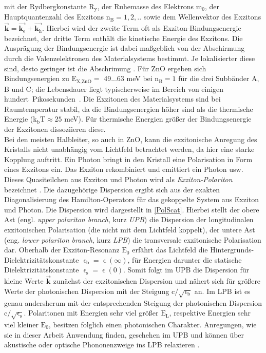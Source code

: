 mit der Rydbergkonstante $\text{R}_\text{y}$, der Ruhemasse des Elektrons $\text{m}_\text{0}$, der Hauptquantenzahl des Exzitons $\text{n}_\text{B}= 1, 2, ..$ sowie dem Wellenvektor des Exzitons $\vec{\textbf{k}}= \vec{\textbf{k$_\text{e}$}}+\vec{\textbf{k$_\text{h}$}}$. Hierbei wird der zweite Term oft als Exziton-Bindungsenergie bezeichnet, der dritte Term enthält die kinetische Energie des Exzitons. Die Ausprägung der Bindungsenergie ist dabei \mbox{maßgeblich} von der Abschirmung durch die Valenzelektronen des \mbox{Materialsystems} bestimmt. Je lokalisierter diese sind, desto geringer ist die Abschrimung \cite{Dvorak.2013}. Für ZnO ergeben sich  Bindungsenergien zu $\text{E}_\text{X,ZnO}=$ 49...63 meV \cite{Mang.1995} bei $\text{n}_\text{B}= 1$ für die drei \mbox{Subbänder} A, B und C; die Lebensdauer liegt typischerweise im Bereich von einigen \mbox{hundert Pikosekunden \cite{Zhang.2007}}. Die Exzitonen des Materialsystems sind bei \mbox{Raumtemperatur} stabil, da die Bindungsenergien höher sind als die thermische Energie ($\text{k}_\text{b}\text{T} \approx 25$ meV). Für thermische Energien größer der Bindungsenergie der Exzitonen dissoziieren diese.\\
Bei den meisten Halbleiter, so auch in ZnO, kann die exzitonische Anregung des \mbox{Kristalls} nicht unabhängig vom Lichtfeld betrachtet werden, da hier eine starke \mbox{Kopplung} \mbox{auftritt}. Ein Photon bringt in den Kristall eine Polarisation in Form eines Exzitons ein. Das \mbox{Exziton} rekombiniert und emittiert ein Photon usw. Dieses Quasiteilchen aus Exziton und Photon wird als \textit{Exziton-Polariton} bezeichnet \cite{Hopfield.1958}. Die dazugehörige \mbox{Dispersion} ergibt sich aus der exakten Diagonalisierung des Hamilton-Operators für das gekoppelte System aus Exziton und Photon. Die Dispersion wird dargestellt in \autoref{PolScat}. Hierbei stellt der obere Ast (engl. \textit{upper polariton branch}, kurz \textit{UPB}) die Dispersion der longitudinalen exzitonischen Polarisation (die nicht mit dem \mbox{Lichtfeld} koppelt), der untere Ast (eng. \textit{lower polariton branch}, kurz \textit{LPB}) die \mbox{transversale} \mbox{exzitonische} \mbox{Polarisation} dar. Oberhalb der Exziton-Resonanz $\text{E}_\text{0}$ erfährt das \mbox{Lichtfeld} die Hintergrunds-Dielektrizitätskonstante $\upvarepsilon _\text{b}=\upvarepsilon (\infty)$, für Energien darunter die \mbox{statische} Dielektrizitätskonstante $\upvarepsilon _\text{s}=\upvarepsilon (\text{0})$. Somit folgt im UPB die Dispersion für \mbox{kleine} \mbox{Werte} $\vec{\textbf{k}}$ zunächst der exzitonischen Dispersion und nähert sich für größere Werte der \mbox{photonischen} Dispersion mit der Steigung $\text{c}/\sqrt{\upvarepsilon _\text{b}}$ an. Im LPB ist es genau \mbox{andersherum} mit der entsprechenden Steigung der photonischen Dispersion $\text{c}/\sqrt{\upvarepsilon _\text{s}}$. Polaritonen mit Energien sehr viel größer $\text{E}_\text{L}$, respektive Energien sehr viel kleiner $\text{E}_\text{0}$, besitzen folglich einen photonischen Charakter. Anregungen, wie sie in dieser Arbeit Anwendung finden, geschehen im UPB und können über akustische oder optische Phononenzweige ins LPB relaxieren \cite{Klingshirn.2007}.\\
